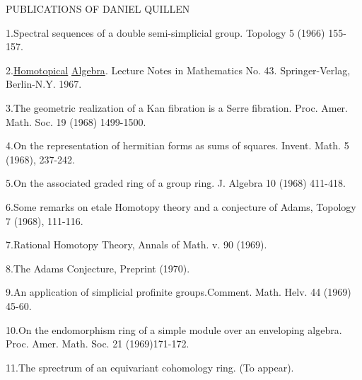 \begin{center}
PUBLICATIONS OF DANIEL QUILLEN
\end{center}

1.\quad Spectral sequences of a double semi-simplicial group. Topology 5 (1966) 155-157.

2.\quad \uline{Homotopical} \uline{Algebra}. Lecture Notes in Mathematics No. 43. Springer-Verlag, Berlin-N.Y. 1967.

3.\quad The geometric realization of a Kan fibration is a Serre fibration. Proc. Amer. Math. Soc. 19 (1968) 1499-1500.

4.\quad On the representation of hermitian forms as sums of squares. Invent. Math. 5 (1968), 237-242.

5.\quad On the associated graded ring of a group ring. J. Algebra 10 (1968) 411-418.

6.\quad Some remarks on etale Homotopy theory and a conjecture of Adams, Topology 7 (1968), 111-116.

7.\quad Rational Homotopy Theory, Annals of Math. v. 90 (1969).

8.\quad The Adams Conjecture, Preprint (1970).

9.\quad An application of simplicial profinite groups.Comment. Math. Helv. 44 (1969) 45-60.

10.\quad On the endomorphism ring of a simple module over an enveloping algebra. Proc. Amer. Math. Soc. 21 (1969)171-172.

11.\quad The sprectrum of an equivariant cohomology ring. (To appear).


